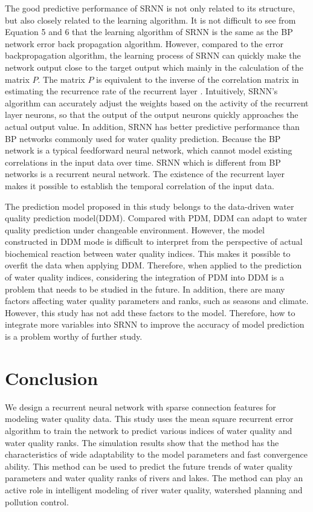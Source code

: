 \documentclass[runningheads]{llncs}
\begin{document}
The good predictive performance of SRNN is not only related to 
its structure, but also closely related to the learning algorithm.
It is not difficult to see from Equation 5 and 6 that the 
learning algorithm of SRNN is the same as the BP network error 
back propagation algorithm. However, compared to the error 
backpropagation algorithm, the learning process of SRNN can 
quickly make the network output close to the target output 
which mainly in the calculation of the matrix $P$. The matrix $P$ 
is equivalent to the inverse of the correlation matrix in 
estimating the recurrence rate of the recurrent layer \cite{RN23}. 
Intuitively, SRNN's algorithm can accurately adjust the weights based on the activity 
of the recurrent layer neurons, so that the output of the 
output neurons quickly approaches the actual output value. 
In addition, SRNN has better predictive performance than BP 
networks commonly used for water quality prediction. Because 
the BP network is a typical feedforward neural network, which 
cannot model existing correlations in the input data 
over time. SRNN which is different from BP networks is a recurrent neural 
network. The existence of the recurrent layer makes it possible 
to establish the temporal correlation of the input data. 

The prediction model proposed in this study belongs to the 
data-driven water quality prediction model(DDM). Compared with
PDM, DDM can adapt to water quality prediction under changeable 
environment. However, the model constructed in DDM mode is 
difficult to interpret from the perspective of actual biochemical 
reaction between water quality indices. This makes it possible
to overfit the data when applying DDM. Therefore, when applied to 
the prediction of water quality indices, considering the integration 
of PDM into DDM is a problem that needs to be studied in the future.
In addition, there are many factors affecting water quality parameters 
and ranks, such as seasons and climate. However, this study has not add 
these factors to the model. Therefore, how to integrate more variables 
into SRNN to improve the accuracy of model prediction is a problem 
worthy of further study.  

\section{Conclusion}
We design a recurrent neural network with sparse
connection features for modeling water quality data. 
This study uses the mean square recurrent error algorithm 
to train the network to predict various indices of water 
quality and water quality ranks. The simulation results 
show that the method has the characteristics of wide 
adaptability to the model parameters and fast convergence ability.
This method can be used to predict the future trends of
water quality parameters and water quality ranks of 
rivers and lakes. The method can play an active role 
in intelligent modeling of river water quality, 
watershed planning and pollution control.
%
%
%
 
 
\end{document}
